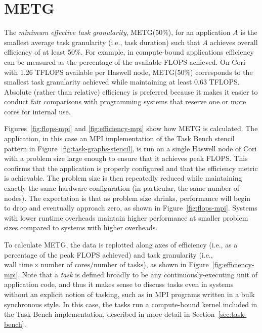 \section{METG}
\label{sec:metg}




The \emph{minimum effective task granularity}, METG(50\%), for an application $A$ is
the smallest average task granularity (i.e., task duration) such that $A$
achieves overall efficiency of at least 50\%. For example, in
compute-bound applications efficiency can be measured as the
percentage of the available FLOPS achieved. On Cori with 1.26 TFLOPS available per Haswell node, METG(50\%) corresponds to
the smallest task granularity achieved while maintaining at least 0.63
TFLOPS. Absolute (rather than relative) efficiency is preferred
because it makes it easier to conduct fair comparisons with
programming systems that reserve one or more cores for internal use.

Figures~\ref{fig:flops-mpi} and \ref{fig:efficiency-mpi} show how METG is
calculated. The application, in this case an MPI implementation of the
Task Bench stencil pattern in Figure~\ref{fig:task-graphs-stencil}, is
run on a single Haswell node of Cori with a problem size large enough to
ensure that it achieves peak FLOPS. This confirms
that the application is properly configured and that the
efficiency metric is achievable. The problem
size is then repeatedly reduced while maintaining exactly the same hardware
configuration (in particular, the same number of nodes). The
expectation is that as problem size shrinks,
performance will begin to drop and eventually approach zero, as shown in Figure~\ref{fig:flops-mpi}. Systems
with lower runtime overheads maintain higher performance at smaller
problem sizes compared to systems with higher overheads.

To calculate METG, the data is replotted along axes of efficiency
(i.e., as a percentage of the peak FLOPS achieved) and task
granularity (i.e., $\text{wall time} \times \text{number of
  cores}/\text{number of tasks}$), as shown in Figure~\ref{fig:efficiency-mpi}. Note that a \emph{task} is defined
broadly to be any continuously-executing unit of application code,
and thus it makes sense to discuss tasks even in systems
without an explicit notion of tasking, such as in MPI programs written in a bulk synchronous style. In this case, the tasks run a
compute-bound kernel included in the Task Bench implementation,
described in more detail in Section~\ref{sec:task-bench}.

